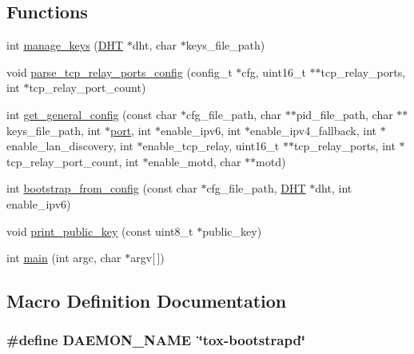 \subsection*{Functions}
\begin{DoxyCompactItemize}
\item 
int \hyperlink{tox-bootstrapd_8c_a0a4dac6d686a3a976d578eb81322a81e}{manage\+\_\+keys} (\hyperlink{struct_d_h_t}{D\+H\+T} $\ast$dht, char $\ast$keys\+\_\+file\+\_\+path)
\item 
void \hyperlink{tox-bootstrapd_8c_a21026d73be31f649ba809b1c56cbdbe6}{parse\+\_\+tcp\+\_\+relay\+\_\+ports\+\_\+config} (config\+\_\+t $\ast$cfg, uint16\+\_\+t $\ast$$\ast$tcp\+\_\+relay\+\_\+ports, int $\ast$tcp\+\_\+relay\+\_\+port\+\_\+count)
\item 
int \hyperlink{tox-bootstrapd_8c_a6d074c4305e232b55bc9894bef6dc957}{get\+\_\+general\+\_\+config} (const char $\ast$cfg\+\_\+file\+\_\+path, char $\ast$$\ast$pid\+\_\+file\+\_\+path, char $\ast$$\ast$keys\+\_\+file\+\_\+path, int $\ast$\hyperlink{irc__syncbot_8c_a8e0798404bf2cf5dabb84c5ba9a4f236}{port}, int $\ast$enable\+\_\+ipv6, int $\ast$enable\+\_\+ipv4\+\_\+fallback, int $\ast$enable\+\_\+lan\+\_\+discovery, int $\ast$enable\+\_\+tcp\+\_\+relay, uint16\+\_\+t $\ast$$\ast$tcp\+\_\+relay\+\_\+ports, int $\ast$tcp\+\_\+relay\+\_\+port\+\_\+count, int $\ast$enable\+\_\+motd, char $\ast$$\ast$motd)
\item 
int \hyperlink{tox-bootstrapd_8c_a3b29f8b1522a8d051f35cc76a54f846a}{bootstrap\+\_\+from\+\_\+config} (const char $\ast$cfg\+\_\+file\+\_\+path, \hyperlink{struct_d_h_t}{D\+H\+T} $\ast$dht, int enable\+\_\+ipv6)
\item 
void \hyperlink{tox-bootstrapd_8c_adac86c780017ad2c55d81005ba02ac89}{print\+\_\+public\+\_\+key} (const uint8\+\_\+t $\ast$public\+\_\+key)
\item 
int \hyperlink{tox-bootstrapd_8c_a0ddf1224851353fc92bfbff6f499fa97}{main} (int argc, char $\ast$argv\mbox{[}$\,$\mbox{]})
\end{DoxyCompactItemize}


\subsection{Macro Definition Documentation}
\hypertarget{tox-bootstrapd_8c_a5ea777c6fb1dd39fda46cdf97a6949a5}{
\subsubsection[{D\+A\+E\+M\+O\+N\+\_\+\+N\+A\+M\+E}]{\setlength{\rightskip}{0pt plus 5cm}\#define D\+A\+E\+M\+O\+N\+\_\+\+N\+A\+M\+E~\char`\"{}tox-\/bootstrapd\char`\"{}}}\label{tox-bootstrapd_8c_a5ea777c6fb1dd39fda46cdf97a6949a5}


